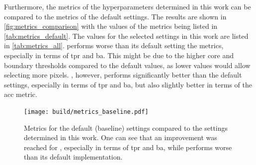 Furthermore, the metrics of the hyperparameters determined in this work can be compared to the
metrics of the default settings. The results are shown in \autoref{fig:metrics_comparison} with the
values of the metrics being listed in \autoref{tab:metrics_default}. The values for the selected
settings in this work are listed in \autoref{tab:metrics_all}.
\fact{} performs worse than its default setting \wrt the metrics, especially in terms of
\gls{tpr} and \gls{ba}. This might be due to the higher core and boundary thresholds compared to the
default values, as lower values would allow selecting more pixels. \tcc{}, however, performs
significantly better than the default settings, especially in terms of \gls{tpr} and \gls{ba}, but
also slightly better in terms of the \gls{acc} metric.
\begin{figure}
    \centering
    \texttt{[image: build/metrics\_baseline.pdf]}
    \caption{Metrics for the default (baseline) settings compared to the settings determined in this work.
    One can see that an improvement was reached for \tcc, especially in terms of \gls{tpr} and \gls{ba}, while
    \fact{} performs worse than its default implementation.}
    \label{fig:metrics_comparison}
\end{figure}
